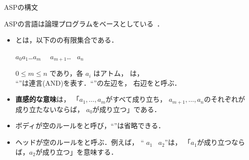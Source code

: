 \begin{frame}{ASPの構文}
  \begin{alertblock}{}\centering
    ASPの言語は論理プログラムをベースとしている~\footnotemark．
  \end{alertblock}
  \begin{itemize}
  \item {}とは，以下のの有限集合である．
    \begin{center}
      \begin{minipage}[c]{0.7\textwidth}
        \begin{block}{}\centering
          $a_0$\quad\code{:-}\quad$a_1$\code{,}\ldots\code{,}$a_m$\code{,}
          \ ~$a_{m+1}$\code{,}\ldots\code{,} ~$a_n$
        \end{block}        
      \end{minipage}
   \end{center}\vfill
    $0 \leq m \leq n$ であり，各 $a_i$ はアトム，
    は，\\
    ``\code{,}''は連言(AND)を表す．``\code{:-}''の左辺を，
		右辺をと呼ぶ．
  \item \alert{\bf 直感的な意味}は，
    「$a_1,\ldots,a_m$がすべて成り立ち，
    $a_{m+1},\ldots,a_n$のそれぞれが成り立たないならば，
    $a_0$が成り立つ」である．
  \item ボディが空のルールをと呼び，``\code{:-}''は省略できる．
  \item ヘッドが空のルールをと呼ぶ．例えば，\hspace{-1ex}
    ``\code{:-} $a_1$\code{,} ~$a_{2}$''は，
    「$a_1$が成り立つならば，$a_2$が成り立つ」を意味する．
  \end{itemize}
\end{frame}
